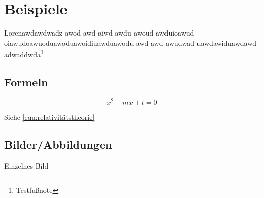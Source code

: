 \documentclass[\maintextsize, \papersize, fleqn, xcolor=dvipsnames]{scrartcl}
\begin{document}
\renewcommand{\sectionautorefname}{Kapitel}
\renewcommand{\subsectionautorefname}{Abschnitt}
\renewcommand{\subsubsectionautorefname}{Unterabschnitt}

\pagestyle{empty}
	

\newpage
	
\mbox{}
\newpage
	
\pagestyle{fancy}
	




\section{Beispiele}\label{sec:beispiel}
	
Lorenawdawdwadz awod awd aiwd awdu awoud awduioawud oiawudoawuoduawoduawoidiuawduawodu awd awd awudwad uawdawiduawdawd adwaddwda\footnote{Testfußnote}

\subsection{Formeln}\label{subsec:formulas}

\begin{equation}\label{equ:relativitätstheorie}
	x^2 + mx + t = 0
\end{equation}

Siehe \autoref{equ:relativitätstheorie}
	
\subsection{Bilder/Abbildungen}\label{subsec:abbildungen}
	
Einzelnes Bild
	
\end{document}
